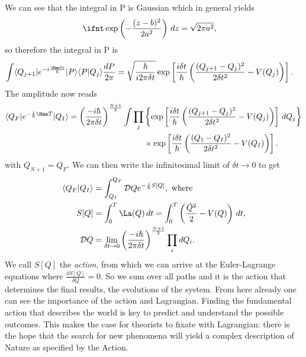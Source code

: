 \documentclass[relqm.tex]{subfiles}
\begin{document}
We can see that the integral in P is Gaussian which in general yields
\begin{align}
    \ifnt \exp\left(-\frac{(z-b)^2}{2a^2}\right)\,dz &= \sqrt{2\pi a^2},
\end{align}
so therefore the integral in P is
\begin{align}
    \int \langle Q_{j+1}|e^{-i\frac{\Ham\delta t}{\hbar}}|P\rangle\langle P|Q_j\rangle\frac{dP}{2\pi} &= \sqrt{\frac{\hbar}{i2\pi\delta t}}\exp\left[\frac{i\delta t}{\hbar}\left(\frac{(Q_{j+1}-Q_j)^2}{2\delta t^2} - V(Q_j)\right)\right].
\end{align}
The amplitude now reads
\begin{align}
    \begin{split}
        \langle Q_F|e^{-\frac{i}{\hbar}\Ham T}|Q_I\rangle = \left(\frac{-i\hbar}{2\pi\delta t}\right)^{\frac{N+1}{2}} \int \prod_j &\left\{\exp\left[\frac{i\delta t}{\hbar}\left(\frac{(Q_{j+1}-Q_j)^2}{2\delta t^2}-V(Q_j)\right)\right]\,dQ_j\right\} \\
                                                                                                                                   &\times \exp\left[\frac{i\delta t}{\hbar}\left(\frac{(Q_1-Q_I)^2}{2\delta t^2}-V(Q_I)\right)\right].
    \end{split}
\end{align}
with $Q_{N+1}=Q_F$.
We can then write the infinitesimal limit of $\delta t\to0$ to get
\begin{align}
    \langle Q_F|Q_I\rangle &= \int_{Q_I}^{Q_F} \mathcal{D}Qe^{-\frac{i}{\hbar}S[Q]}, \text{ where }\\
    S[Q] &= \int_0^T \La(Q)\,dt = \int_0^T \left(\frac{\dot{Q}^2}{2}-V(Q)\right)\,dt, \\
    \mathcal{D}Q &= \lim_{\delta t\to0} \left(\frac{-i\hbar}{2\pi\delta t}\right)^{\frac{N+1}{2}}\prod_i dQ_i.
\end{align}
We call $S[Q]$ the \emph{action}, from which we can arrive at the Euler-Lagrange equations where $\frac{\delta S[Q]}{\delta Q} = 0$.
So we sum over all paths and it is the action that determines the final results, the evolutions of the system. 
From here already one can see the importance of the action and Lagrangian. Finding the fundamental action that describes the world is key to predict and understand the possible outcomes. 
This makes the case for theorists to fixate with Lagrangian: there is the hope that the search for new phenomena will yield a complex description of Nature as specified by the Action. 
\end{document}
